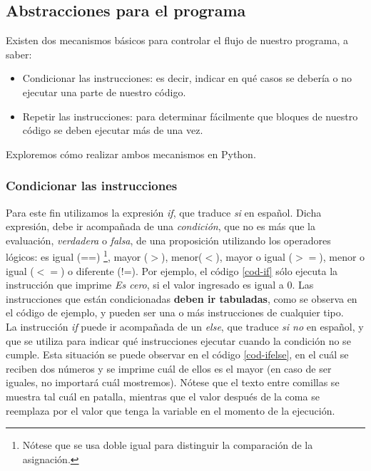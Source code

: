 

\subsection{Abstracciones para el programa}

Existen dos mecanismos básicos para controlar el flujo de nuestro programa, a saber:

\begin{itemize}
\item Condicionar las instrucciones: es decir, indicar en qué casos se debería o no ejecutar una parte de nuestro código.
\item Repetir las instrucciones: para determinar fácilmente que bloques de nuestro código se deben ejecutar más de una vez.
\end{itemize}

Exploremos cómo realizar ambos mecanismos en Python.

\subsubsection{Condicionar las instrucciones}

Para este fin utilizamos la expresión \emph{if}, que traduce \emph{si} en español. Dicha expresión, debe ir acompañada de una \emph{condición}, que no es más que la evaluación, \emph{verdadera} o \emph{falsa}, de una proposición utilizando los operadores lógicos: es igual (==) \footnote{Nótese que se usa doble igual para distinguir la comparación de la asignación.}, mayor ($>$), menor($<$), mayor o igual ($>=$), menor o igual ($<=$) o diferente (!=). Por ejemplo, el código \ref{cod-if} sólo ejecuta la instrucción que imprime \emph{Es cero}, si  el valor ingresado es igual a 0. Las instrucciones que están condicionadas \textbf{deben ir tabuladas}, como se observa en el código de ejemplo, y pueden ser una o más instrucciones de cualquier tipo. \\




La instrucción \emph{if} puede ir acompañada de un \emph{else}, que traduce \emph{si no} en español, y que se utiliza para indicar qué instrucciones ejecutar cuando la condición no se cumple. Esta situación se puede observar en el código \ref{cod-ifelse}, en el cuál se reciben dos números y se imprime cuál de ellos es el mayor (en caso de ser iguales, no importará cuál mostremos). Nótese que el texto entre comillas se muestra tal cuál en patalla, mientras que el valor después de la coma se reemplaza por el valor que tenga la variable en el momento de la ejecución. \\

